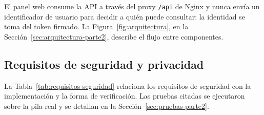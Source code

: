 El panel web consume la API a través del proxy \texttt{/api} de Nginx y nunca envía un identificador de usuario para decidir a quién puede consultar: la identidad se toma del token firmado. La Figura~\ref{fig:arquitectura}, en la Sección~\ref{sec:arquitectura-parte2}, describe el flujo entre componentes.

\subsection{Requisitos de seguridad y privacidad}

La Tabla~\ref{tab:requisitos-seguridad} relaciona los requisitos de seguridad con la implementación y la forma de verificación. Las pruebas citadas se ejecutaron sobre la pila real y se detallan en la Sección~\ref{sec:pruebas-parte2}.

